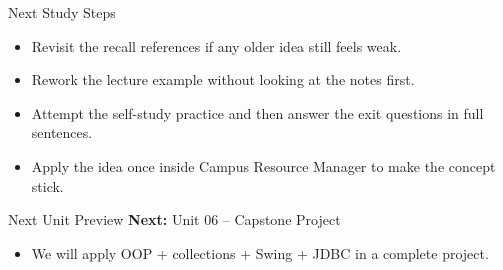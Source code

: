 \documentclass{beamer}
\begin{document}
\begin{frame}{Next Study Steps}
\begin{itemize}[<+->]
  \item Revisit the recall references if any older idea still feels weak.
  \item Rework the lecture example without looking at the notes first.
  \item Attempt the self-study practice and then answer the exit questions in full sentences.
  \item Apply the idea once inside Campus Resource Manager to make the concept stick.
\end{itemize}
  \slidesources{\OOPSUnitVSources}
\end{frame}

\begin{frame}{Next Unit Preview}
  \textbf{Next:} Unit 06 -- Capstone Project
  \vspace{0.6em}
  \begin{itemize}[<+->]
    \item We will apply OOP + collections + Swing + JDBC in a complete project.
  \end{itemize}
  \slidesources{\OOPSUnitVSources}
\end{frame}
\end{document}
